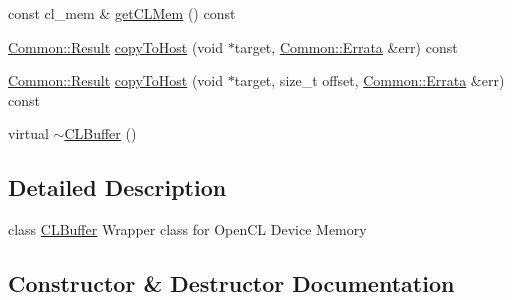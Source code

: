 \begin{DoxyCompactItemize}
\item 
const cl\+\_\+mem \& \hyperlink{class_c_l_ray_tracer_1_1_open_c_l_utils_1_1_c_l_buffer_a5a79c7ed839e19fb118e84758b241276}{get\+C\+L\+Mem} () const 
\item 
\hyperlink{_errata_8h_a389396702f1aff6e71eb21328b0775c1}{Common\+::\+Result} \hyperlink{class_c_l_ray_tracer_1_1_open_c_l_utils_1_1_c_l_buffer_a08e9f3813a61b58defd4b206a0a4036a}{copy\+To\+Host} (void $\ast$target, \hyperlink{class_c_l_ray_tracer_1_1_common_1_1_errata}{Common\+::\+Errata} \&err) const 
\item 
\hyperlink{_errata_8h_a389396702f1aff6e71eb21328b0775c1}{Common\+::\+Result} \hyperlink{class_c_l_ray_tracer_1_1_open_c_l_utils_1_1_c_l_buffer_a9d187aabadc1ecfd023ae1c2e7638d33}{copy\+To\+Host} (void $\ast$target, size\+\_\+t offset, \hyperlink{class_c_l_ray_tracer_1_1_common_1_1_errata}{Common\+::\+Errata} \&err) const 
\item 
virtual \hyperlink{class_c_l_ray_tracer_1_1_open_c_l_utils_1_1_c_l_buffer_aa292571c35f1cf3c0124efc824641ada}{$\sim$\+C\+L\+Buffer} ()
\end{DoxyCompactItemize}


\subsection{Detailed Description}
class \hyperlink{class_c_l_ray_tracer_1_1_open_c_l_utils_1_1_c_l_buffer}{C\+L\+Buffer} Wrapper class for Open\+CL Device Memory 

\subsection{Constructor \& Destructor Documentation}
